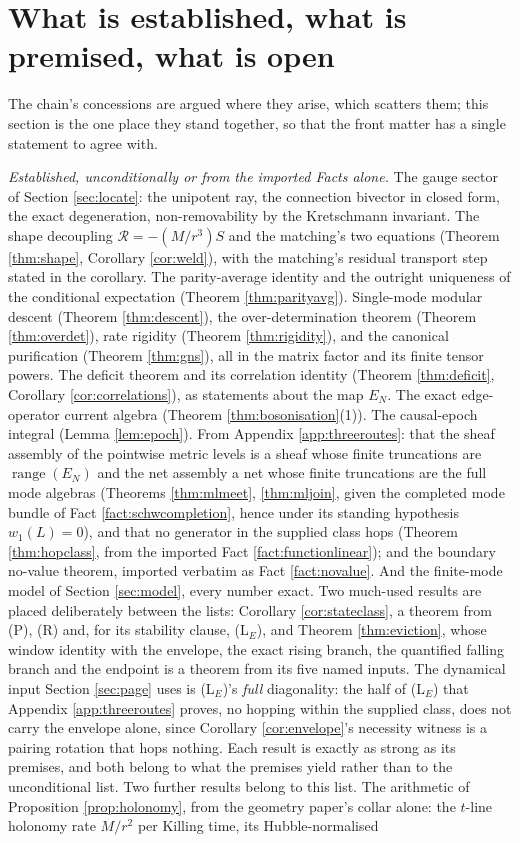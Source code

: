\documentclass[11pt]{article}
\theoremstyle{definition}
\newcommand{\shL}{L}
\newcommand{\EN}{E_{N}}
\begin{document}
\section{What is established, what is premised, what is open}\label{sec:conclusion}

The chain's concessions are argued where they arise, which scatters them; this section is the one place they stand together, so that the front matter has a single statement to agree with.

\emph{Established, unconditionally or from the imported Facts alone.} The gauge sector of Section \ref{sec:locate}: the unipotent ray, the connection bivector in closed form, the exact degeneration, non-removability by the Kretschmann invariant. The shape decoupling $\mathcal{R} = -(M/r^{3})S$ and the matching's two equations (Theorem \ref{thm:shape}, Corollary \ref{cor:weld}), with the matching's residual transport step stated in the corollary. The parity-average identity and the outright uniqueness of the conditional expectation (Theorem \ref{thm:parityavg}). Single-mode modular descent (Theorem \ref{thm:descent}), the over-determination theorem (Theorem \ref{thm:overdet}), rate rigidity (Theorem \ref{thm:rigidity}), and the canonical purification (Theorem \ref{thm:gns}), all in the matrix factor and its finite tensor powers. The deficit theorem and its correlation identity (Theorem \ref{thm:deficit}, Corollary \ref{cor:correlations}), as statements about the map $\EN$. The exact edge-operator current algebra (Theorem \ref{thm:bosonisation}(1)). The causal-epoch integral (Lemma \ref{lem:epoch}). From Appendix \ref{app:threeroutes}: that the sheaf assembly of the pointwise metric levels is a sheaf whose finite truncations are $\operatorname{range}(\EN)$ and the net assembly a net whose finite truncations are the full mode algebras (Theorems \ref{thm:mlmeet}, \ref{thm:mljoin}, given the completed mode bundle of Fact \ref{fact:schwcompletion}, hence under its standing hypothesis $w_1(\shL) = 0$), and that no generator in the supplied class hops (Theorem \ref{thm:hopclass}, from the imported Fact \ref{fact:functionlinear}); and the boundary no-value theorem, imported verbatim as Fact \ref{fact:novalue}. And the finite-mode model of Section \ref{sec:model}, every number exact. Two much-used results are placed deliberately between the lists: Corollary \ref{cor:stateclass}, a theorem from (P), (R) and, for its stability clause, (L$_E$), and Theorem \ref{thm:eviction}, whose window identity with the envelope, the exact rising branch, the quantified falling branch and the endpoint is a theorem from its five named inputs. The dynamical input Section \ref{sec:page} uses is (L$_E$)'s \emph{full} diagonality: the half of (L$_E$) that Appendix \ref{app:threeroutes} proves, no hopping within the supplied class, does not carry the envelope alone, since Corollary \ref{cor:envelope}'s necessity witness is a pairing rotation that hops nothing. Each result is exactly as strong as its premises, and both belong to what the premises yield rather than to the unconditional list. Two further results belong to this list. The arithmetic of Proposition \ref{prop:holonomy}, from the geometry paper's collar alone: the $t$-line holonomy rate $M/r^2$ per Killing time, its Hubble-normalised 
\end{document}
